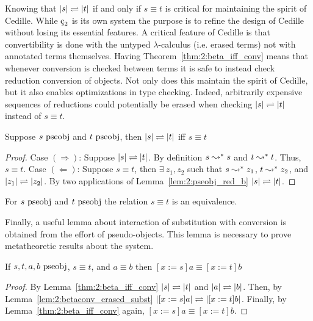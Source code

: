 Knowing that $|s| \rightleftharpoons |t|$ if and only if $s \equiv t$ is critical for maintaining the spirit of Cedille.
While $\ced$ is its own system the purpose is to refine the design of Cedille without losing its essential features.
A critical feature of Cedille is that convertibility is done with the untyped $\lambda$-calculus (i.e. erased terms) not with annotated terms themselves.
Having Theorem~\ref{thm:2:beta_iff_conv} means that whenever conversion is checked between terms it is safe to instead check reduction conversion of objects.
Not only does this maintain the spirit of Cedille, but it also enables optimizations in type checking.
Indeed, arbitrarily expensive sequences of reductions could potentially be erased when checking $|s| \rightleftharpoons |t|$ instead of $s \equiv t$.

\begin{theorem}
    Suppose $s~\textnormal{pseobj}$ and $t~\textnormal{pseobj}$, then $|s| \rightleftharpoons |t|$ iff $s \equiv t$
    \label{thm:2:beta_iff_conv}
\end{theorem}
\begin{proof}
    Case $(\Rightarrow)$:
    Suppose $|s| \rightleftharpoons |t|$.
    By definition $s \leadsto^* s$ and $t \leadsto^* t$.
    Thus, $s \equiv t$.
    Case $(\Leftarrow)$:
    Suppose $s \equiv t$, then $\exists\ z_1, z_2$ such that $s \leadsto^* z_1$, $t \leadsto^* z_2$, and $|z_1| \rightleftharpoons |z_2|$.
    By two applications of Lemma~\ref{lem:2:pseobj_red_b} $|s| \rightleftharpoons |t|$.
\end{proof}

\begin{corollary}
    For $s~\textnormal{pseobj}$ and $t~\textnormal{pseobj}$ the relation $s \equiv t$ is an equivalence.
\end{corollary}

Finally, a useful lemma about interaction of substitution with conversion is obtained from the effort of pseudo-objects.
This lemma is necessary to prove metatheoretic results about the system.

\begin{lemma}
    If $s, t, a, b~\textnormal{pseobj}$, $s \equiv t$, and $a \equiv b$ then $[x := s]a \equiv [x := t]b$
    \label{lem:2:conv_subst}
\end{lemma}
\begin{proof}
    By Lemma~\ref{thm:2:beta_iff_conv} $|s| \rightleftharpoons |t|$ and $|a| \rightleftharpoons |b|$.
    Then, by Lemma~\ref{lem:2:betaconv_erased_subst} $|[x := s]a| \rightleftharpoons |[x := t]b|$.
    Finally, by Lemma~\ref{thm:2:beta_iff_conv} again, $[x := s]a \equiv [x := t]b$.
\end{proof}

